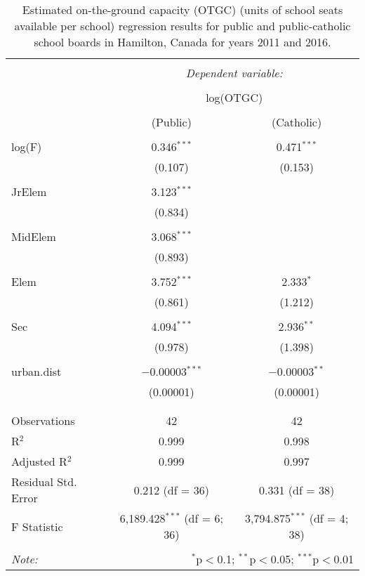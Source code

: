 
\begin{table}[!htbp] \centering 
  \caption{Estimated on-the-ground capacity (OTGC) (units of school seats available per school) regression results for public and public-catholic school boards in Hamilton, Canada for years 2011 and 2016.} 
  \label{TabA1-OTGC} 
\begin{tabular}{@{\extracolsep{5pt}}lcc} 
\\[-1.8ex]\hline 
\hline \\[-1.8ex] 
 & \multicolumn{2}{c}{\textit{Dependent variable:}} \\ 
\\[-1.8ex] & \multicolumn{2}{c}{log(OTGC)} \\ 
\\[-1.8ex] & (Public) & (Catholic)\\ 
\hline \\[-1.8ex] 
 log(F) & 0.346$^{***}$ & 0.471$^{***}$ \\ 
  & (0.107) & (0.153) \\ 
  & & \\ 
 JrElem & 3.123$^{***}$ &  \\ 
  & (0.834) &  \\ 
  & & \\ 
 MidElem & 3.068$^{***}$ &  \\ 
  & (0.893) &  \\ 
  & & \\ 
 Elem & 3.752$^{***}$ &  2.333$^{*}$\\ 
  & (0.861) & (1.212) \\ 
  & & \\ 
 Sec & 4.094$^{***}$ &  2.936$^{**}$ \\ 
  & (0.978) & (1.398) \\ 
  & & \\ 
 urban.dist & $-$0.00003$^{***}$ & $-$0.00003$^{**}$ \\ 
  & (0.00001) & (0.00001) \\ 
  & & \\ 
\hline \\[-1.8ex] 
Observations & 42 & 42 \\ 
R$^{2}$ & 0.999 & 0.998 \\ 
Adjusted R$^{2}$ & 0.999 & 0.997 \\ 
Residual Std. Error & 0.212 (df = 36) & 0.331 (df = 38) \\ 
F Statistic & 6,189.428$^{***}$ (df = 6; 36) & 3,794.875$^{***}$ (df = 4; 38) \\ 
\hline 
\hline \\[-1.8ex] 
\textit{Note:}  & \multicolumn{2}{r}{$^{*}$p$<$0.1; $^{**}$p$<$0.05; $^{***}$p$<$0.01} \\ 
\end{tabular} 
\end{table} 
